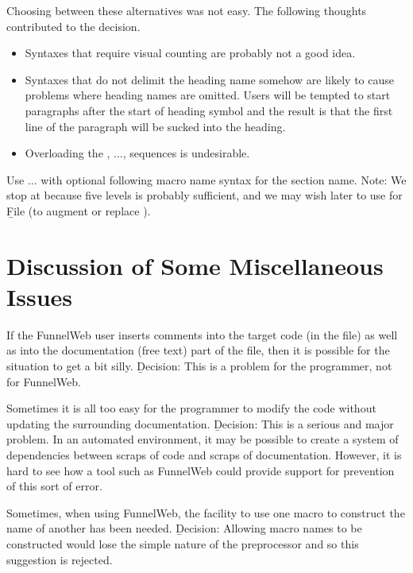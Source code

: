 Choosing between these alternatives was not easy. The following thoughts
contributed to the decision.

\begin{itemize}

\item Syntaxes that require visual counting are probably not a good idea.

\item Syntaxes that do not delimit the heading name somehow are likely
to cause problems where heading names are omitted. Users will be
tempted to start paragraphs after the start of heading symbol and the
result is that the first line of the paragraph will be sucked into the
heading.

\item Overloading the , $\ldots$,  sequences is undesirable.


\end{itemize}

 Use $\ldots$ with optional following
macro name syntax for the section name.
Note: We stop at  because five levels is probably sufficient, and we
may wish later to use  for \b{F}ile (to augment or replace ).


\section{Discussion of Some Miscellaneous Issues}

 If
the FunnelWeb user inserts
comments into the target code (in the  file) as well as into the
documentation (free text)
part of the  file, then it is possible for the
situation to get a bit silly. \b{Decision:} This is a problem for the
programmer, not for FunnelWeb.

 Sometimes
it is all too easy for the
programmer to modify the code without updating the surrounding documentation.
\b{Decision:} This is a serious and major problem. In an automated environment,
it may be possible to create a system of dependencies between scraps of
code and scraps of documentation. However, it is hard to see how a tool
such as FunnelWeb could provide support for prevention of this sort of error.

 Sometimes, when using FunnelWeb,
the facility to use one macro to construct the name of another has been
needed. \b{Decision:} Allowing macro names
to be constructed would lose the simple
nature of the preprocessor and so this suggestion is rejected.

